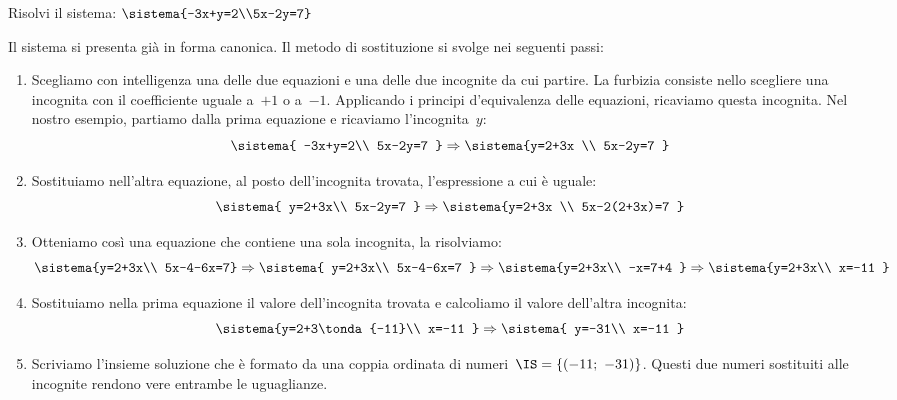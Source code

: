 \begin{esempio}{}{}
Risolvi il sistema: \quad \(\sistema{-3x+y=2\\5x-2y=7}\)

\medskip
Il sistema si presenta già in forma canonica. Il metodo di
sostituzione si svolge nei seguenti passi:

\begin{enumerate}[nosep, left=0mm]
 \item Scegliamo con intelligenza una delle due equazioni e una
delle due incognite da cui partire. 
La furbizia consiste nello scegliere una incognita con il coefficiente 
uguale a~\(+1\) o a~\(-1\).
Applicando i principi d'equivalenza delle equazioni, ricaviamo questa
incognita.
Nel nostro esempio, partiamo dalla prima equazione e ricaviamo
l'incognita~\(y\):\\[-.5em]
\[\sistema{
     -3x+y=2\\
     5x-2y=7
  }
\Rightarrow
  \sistema{y=2+3x \\
           5x-2y=7
  }
\]
\item Sostituiamo nell'altra equazione, al posto
dell'incognita trovata, l'espressione a cui è uguale:\\[-.5em]
\[\sistema{
     y=2+3x\\
     5x-2y=7
  }
\Rightarrow
\sistema{y=2+3x \\
         5x-2(2+3x)=7
}\]
\item Otteniamo così una equazione che contiene una sola 
incognita, la risolviamo:\\[-.5em]
{\small
\[\sistema{y=2+3x\\
5x-4-6x=7}\Rightarrow
\sistema{
         y=2+3x\\
         5x-4-6x=7
        }\Rightarrow
 \sistema{y=2+3x\\
         -x=7+4
        }\Rightarrow
 \sistema{y=2+3x\\
         x=-11
  }\]
} %
\item Sostituiamo nella prima equazione il valore dell'incognita 
trovata e calcoliamo il valore dell'altra incognita:\\[-.5em]
\[ \sistema{y=2+3\tonda{-11}\\
         x=-11
  }\Rightarrow
  \sistema{
         y=-31\\
         x=-11
  }\]
\item Scriviamo l'insieme soluzione che è formato da una coppia ordinata 
di numeri~\(\IS=\{(-11;~-31)\}\). Questi due numeri sostituiti alle 
incognite rendono vere entrambe le uguaglianze.
\end{enumerate}
\end{esempio}

